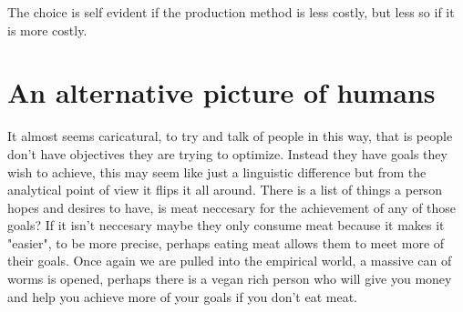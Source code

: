 The choice is self evident if the production method is less costly, but less so if it is more costly. 


\section{An alternative picture of humans}

It almost seems caricatural, to try and talk of people in this way, that is people don't have objectives they are trying to optimize. Instead they have goals they wish to achieve, this may seem like just a linguistic difference but from the analytical point of view it flips it all around. There is a list of things a person hopes and desires to have, is meat neccesary for the achievement of any of those goals? If it isn't neccesary maybe they only consume meat because it makes it "easier", to be more precise, perhaps eating meat allows them to meet more of their goals. Once again we are pulled into the empirical world, a massive can of worms is opened, perhaps there is a vegan rich person who will give you money and help you achieve more of your goals if you don't eat meat. 




